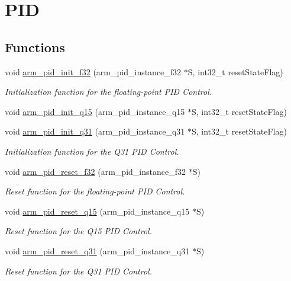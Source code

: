 \hypertarget{group__PID}{}\section{P\+ID}
\label{group__PID}
\subsection*{Functions}
\begin{DoxyCompactItemize}
\item 
void \hyperlink{group__PID_gae31536b19b82b93ed184fb1ab73cfcb3}{arm\+\_\+pid\+\_\+init\+\_\+f32} (arm\+\_\+pid\+\_\+instance\+\_\+f32 $\ast$S, int32\+\_\+t reset\+State\+Flag)
\begin{DoxyCompactList}\small\item\em Initialization function for the floating-\/point P\+ID Control. \end{DoxyCompactList}\item 
void \hyperlink{group__PID_ga2cb1e3d3ebb167348fdabec74653d5c3}{arm\+\_\+pid\+\_\+init\+\_\+q15} (arm\+\_\+pid\+\_\+instance\+\_\+q15 $\ast$S, int32\+\_\+t reset\+State\+Flag)
\item 
void \hyperlink{group__PID_gad9d88485234fa9460b1ce9e64989ac86}{arm\+\_\+pid\+\_\+init\+\_\+q31} (arm\+\_\+pid\+\_\+instance\+\_\+q31 $\ast$S, int32\+\_\+t reset\+State\+Flag)
\begin{DoxyCompactList}\small\item\em Initialization function for the Q31 P\+ID Control. \end{DoxyCompactList}\item 
void \hyperlink{group__PID_ga9ec860bcb6f8ca31205bf0f1b51ab723}{arm\+\_\+pid\+\_\+reset\+\_\+f32} (arm\+\_\+pid\+\_\+instance\+\_\+f32 $\ast$S)
\begin{DoxyCompactList}\small\item\em Reset function for the floating-\/point P\+ID Control. \end{DoxyCompactList}\item 
void \hyperlink{group__PID_ga408566dacb4fa6e0458b2c75672e525f}{arm\+\_\+pid\+\_\+reset\+\_\+q15} (arm\+\_\+pid\+\_\+instance\+\_\+q15 $\ast$S)
\begin{DoxyCompactList}\small\item\em Reset function for the Q15 P\+ID Control. \end{DoxyCompactList}\item 
void \hyperlink{group__PID_gaeecbacd3fb37c608ec25474d3a0dffa9}{arm\+\_\+pid\+\_\+reset\+\_\+q31} (arm\+\_\+pid\+\_\+instance\+\_\+q31 $\ast$S)
\begin{DoxyCompactList}\small\item\em Reset function for the Q31 P\+ID Control. \end{DoxyCompactList}\end{DoxyCompactItemize}


